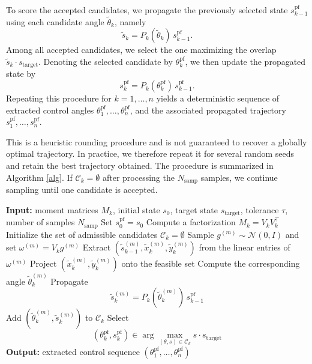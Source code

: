 \documentclass[11pt,a4paper]{article}
\theoremstyle{definition}
\begin{document}
To score the accepted candidates, we propagate the previously selected state \(s_{k-1}^{\mathrm{pf}}\) using each candidate angle \(\widetilde\theta_k\), namely
\[
\widetilde s_k = P_k(\widetilde\theta_k)\, s_{k-1}^{\mathrm{pf}}.
\]
Among all accepted candidates, we select the one maximizing the overlap $\widetilde s_k\cdot s_{\mathrm{target}}$. Denoting the selected candidate by \(\theta_k^{\mathrm{pf}}\), we then update the propagated state by
\[
s_k^{\mathrm{pf}} = P_k(\theta_k^{\mathrm{pf}})\, s_{k-1}^{\mathrm{pf}}.
\]
Repeating this procedure for \(k=1,\dots,n\) yields a deterministic sequence of extracted control angles $\theta_1^{\mathrm{pf}},\dots,\theta_n^{\mathrm{pf}}$, and the associated propagated trajectory $s_1^{\mathrm{pf}},\dots,s_n^{\mathrm{pf}}$.

This is a heuristic rounding procedure and is not guaranteed to recover a globally optimal trajectory. In practice, we therefore repeat it for several random seeds and retain the best trajectory obtained. The procedure is summarized in Algorithm \ref{alg}. If $\mathcal{C}_k=\emptyset$ after processing the $N_{\mathrm{samp}}$ samples, we continue sampling until one candidate is accepted.

\begin{algorithm}[H]
\caption{Sequential randomized extraction for push-forward hierarchy}\label{alg}
\begin{algorithmic}[1]
\State \textbf{Input:} moment matrices \(M_k\), initial state \(s_0\), target state \(s_{\mathrm{target}}\), tolerance \(\tau\), number of samples \(N_{\mathrm{samp}}\)
\State Set \(s_0^{\mathrm{pf}}=s_0\)
    \State Compute a factorization \(M_k=V_kV_k^\top\)
    \State Initialize the set of admissible candidates \(\mathcal C_k=\emptyset\)
        \State Sample \(g^{(m)}\sim\mathcal N(0,I)\) and set \(\omega^{(m)}=V_kg^{(m)}\)
        \State Extract \((\widetilde s_{k-1}^{(m)},\widetilde x_k^{(m)},\widetilde y_k^{(m)})\) from the linear entries of \(\omega^{(m)}\)
            \State Project \((\widetilde x_k^{(m)},\widetilde y_k^{(m)})\) onto the feasible set
            \State Compute the corresponding angle \(\widetilde\theta_k^{(m)}\)
            \State Propagate
            \[
            \widetilde s_k^{(m)}=P_k(\widetilde\theta_k^{(m)})\,s_{k-1}^{\mathrm{pf}}
            \]
            \State Add \((\widetilde\theta_k^{(m)},\widetilde s_k^{(m)})\) to \(\mathcal C_k\)
        \EndIf
    \EndFor
    \State Select
    \[
    (\theta_k^{\mathrm{pf}},s_k^{\mathrm{pf}})
    \in
    \arg\max_{(\theta,s)\in\mathcal C_k} s\cdot s_{\mathrm{target}}
    \]
\EndFor
\State \textbf{Output:} extracted control sequence \((\theta_1^{\mathrm{pf}},\dots,\theta_n^{\mathrm{pf}})\)
\end{algorithmic}
\end{algorithm}
\end{document}

